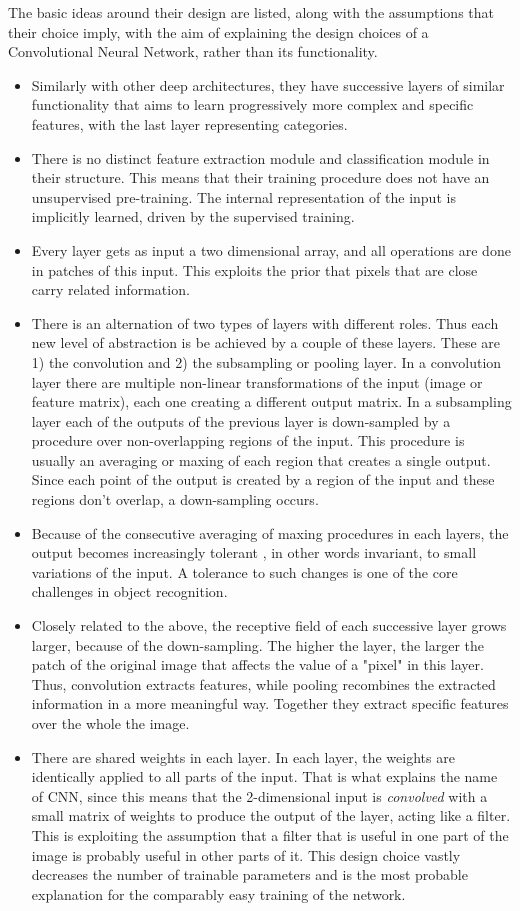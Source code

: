 \documentclass[a4paper]{article}
\begin{document}
		
		The basic ideas around their design are listed, along with the assumptions that their choice imply, with the aim of explaining the design choices of a Convolutional Neural Network, rather than its functionality.
		\begin{itemize}
			\item Similarly with other deep architectures, they have successive layers of similar functionality that aims to learn progressively more complex and specific features, with the last layer representing categories. 
			\item There is no distinct feature extraction module and classification module in their structure. This means that their training procedure does not have an unsupervised pre-training. The internal representation of the input is implicitly learned, driven by the supervised training.
			\item Every layer gets as input a two dimensional array, and all operations are done in patches of this input. This exploits the prior that pixels that are close carry related information.
			\item There is an alternation of two types of layers with different roles. Thus each new level of abstraction is be achieved by a couple of these layers. These are 1) the convolution and 2) the subsampling or pooling layer. In a convolution layer there are multiple non-linear transformations of the input (image or feature matrix), each one creating a different output matrix. In a subsampling layer each of the outputs of the previous layer is down-sampled  by a procedure over non-overlapping regions of the input. This procedure is usually an averaging or maxing of each region that creates a single output. Since each point of the output is created by a region of the input and these regions don't overlap, a down-sampling occurs.
			\item Because of the consecutive averaging of maxing procedures in each layers, the output becomes increasingly tolerant , in other words invariant, to small variations of the input. A tolerance to such changes is one of the core challenges in object recognition.
			\item Closely related to the above, the receptive field of each successive layer grows larger, because of the down-sampling. The higher the layer, the larger the patch of the original image that affects the value of a "pixel" in this layer.  Thus, convolution extracts features, while pooling recombines the extracted information in a more meaningful way. Together they extract specific features over the whole the image.
			\item There are shared weights in each layer. In each layer, the weights are identically applied to all parts of the input. That is what explains the name of CNN, since this means that the 2-dimensional input is \textit{convolved} with a small matrix of weights to produce the output of the layer, acting like a filter. This is exploiting the assumption that a filter that is useful in one part of the image is probably useful in other parts of it. This design choice vastly decreases the number of trainable parameters and is the most probable explanation for the comparably easy training of the network.
		\end{itemize}
		
\end{document}
